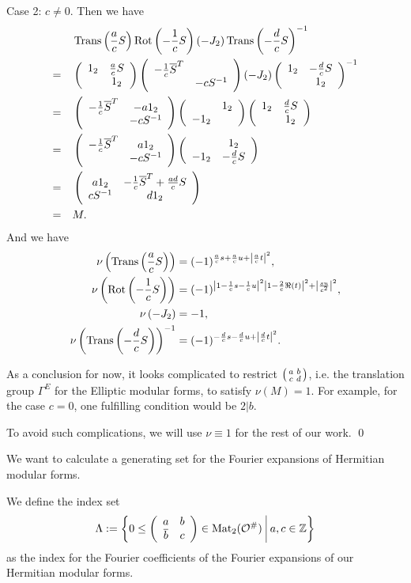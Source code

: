 \begin{remark}
Case 2: $c\neq 0$. Then we have
\begin{align*}
& \operatorname{Trans}\left(\frac{a}{c}S\right) \operatorname{Rot}\left(-\frac{1}{c}S\right) (-J_2) \operatorname{Trans}\left(-\frac{d}{c}S\right)^{-1} \\
=\quad & \left( \begin{array}{cc} 1_2 & \frac{a}{c}S \\  & 1_2 \end{array} \right)
\left( \begin{array}{cc} -\frac{1}{c}\overline{S}^T &  \\  & -cS^{-1} \end{array} \right)
(-J_2)
\left( \begin{array}{cc} 1_2 & -\frac{d}{c}S \\  & 1_2 \end{array} \right)^{-1} \\
=\quad &
\left( \begin{array}{cc} -\frac{1}{c}\overline{S}^T & -a 1_2 \\  & -cS^{-1} \end{array} \right)
\left( \begin{array}{cc}  & 1_2 \\ -1_2 &  \end{array} \right)
\left( \begin{array}{cc} 1_2 & \frac{d}{c}S \\  & 1_2 \end{array} \right) \\
=\quad &
\left( \begin{array}{cc} -\frac{1}{c}\overline{S}^T & a 1_2 \\  & -cS^{-1} \end{array} \right)
\left( \begin{array}{cc}  & 1_2 \\ -1_2 & -\frac{d}{c}S \end{array} \right) \\
=\quad &
\left( \begin{array}{cc} a 1_2 & -\frac{1}{c}\overline{S}^T + \frac{ad}{c}S \\ cS^{-1} & d 1_2 \end{array} \right) \\
=\quad &
M.
\end{align*}
And we have
\begin{align*}
\nu\left( \operatorname{Trans}\left(\frac{a}{c}S \right) \right) & = (-1)^{\frac{a}{c}s + \frac{a}{c}u + \left|\frac{a}{c} t \right|^2} , \\
\nu\left( \operatorname{Rot}\left(-\frac{1}{c}S \right) \right) & = (-1)^{\left|1-\frac{1}{c}s -\frac{1}{c}u\right|^2 \left|1 - \frac{2}{c}\Re(t) \right|^2 + \left| \frac{su}{c^2} \right|^2 } , \\
\nu\left( -J_2 \right) & = -1 , \\
\nu\left( \operatorname{Trans}\left(-\frac{d}{c}S \right) \right)^{-1} & = (-1)^{-\frac{d}{c}s - \frac{d}{c}u + \left|\frac{d}{c} t \right|^2} . \\
\end{align*}

As a conclusion for now, it looks complicated to restrict $\left( \begin{smallmatrix} a & b \\ c & d \end{smallmatrix} \right)$, i.e. the translation group $\Gamma^E$ for the Elliptic modular forms, to satisfy $\nu(M)=1$. For example, for the case $c=0$, one fulfilling condition would be $2 | b$.

To avoid such complications, we will use $\nu \equiv 1$ for the rest of our work.
\qed
\end{remark}


\begin{prelim}
We want to calculate a generating set for the Fourier expansions of Hermitian modular forms.

We define the index set
\[ \Lambda := \Set{0 \le \SimpleMatrix{a}{b}{\overline b}{c} \in \M_2(\curlO^\#)}{a,c \in \Z } \]
as the index for the Fourier coefficients of the Fourier expansions of our Hermitian modular forms.
\end{prelim}

